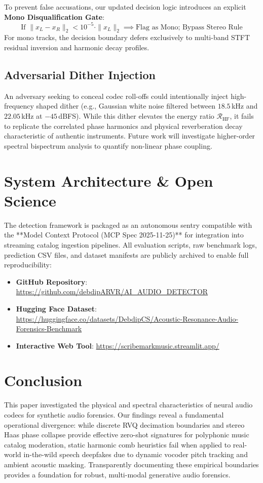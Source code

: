 \documentclass[conference]{IEEEtran}
\theoremstyle{definition}
\begin{document}
To prevent false accusations, our updated decision logic introduces an explicit \textbf{Mono Disqualification Gate}:
\begin{equation}
\text{If } \|x_L - x_R\|_2 < 10^{-5} \cdot \|x_L\|_2 \implies \text{Flag as Mono; Bypass Stereo Rule}
\end{equation}
For mono tracks, the decision boundary defers exclusively to multi-band STFT residual inversion and harmonic decay profiles.

\subsection{Adversarial Dither Injection}
An adversary seeking to conceal codec roll-offs could intentionally inject high-frequency shaped dither (e.g., Gaussian white noise filtered between $18.5$\,kHz and $22.05$\,kHz at $-45$\,dBFS). While this dither elevates the energy ratio $\mathcal{R}_{\text{HF}}$, it fails to replicate the correlated phase harmonics and physical reverberation decay characteristic of authentic instruments. Future work will investigate higher-order spectral bispectrum analysis to quantify non-linear phase coupling.

\section{System Architecture & Open Science}

The detection framework is packaged as an autonomous sentry compatible with the **Model Context Protocol (MCP Spec 2025-11-25)** for integration into streaming catalog ingestion pipelines. 
All evaluation scripts, raw benchmark logs, prediction CSV files, and dataset manifests are publicly archived to enable full reproducibility:
\begin{itemize}
    \item \textbf{GitHub Repository}: \url{https://github.com/debdipARVR/AI_AUDIO_DETECTOR}
    \item \textbf{Hugging Face Dataset}: \url{https://huggingface.co/datasets/DebdipCS/Acoustic-Resonance-Audio-Forensics-Benchmark}
    \item \textbf{Interactive Web Tool}: \url{https://scribemarkmusic.streamlit.app/}
\end{itemize}

\section{Conclusion}
This paper investigated the physical and spectral characteristics of neural audio codecs for synthetic audio forensics. Our findings reveal a fundamental operational divergence: while discrete RVQ decimation boundaries and stereo Haas phase collapse provide effective zero-shot signatures for polyphonic music catalog moderation, static harmonic comb heuristics fail when applied to real-world in-the-wild speech deepfakes due to dynamic vocoder pitch tracking and ambient acoustic masking. Transparently documenting these empirical boundaries provides a foundation for robust, multi-modal generative audio forensics.



\end{document}
